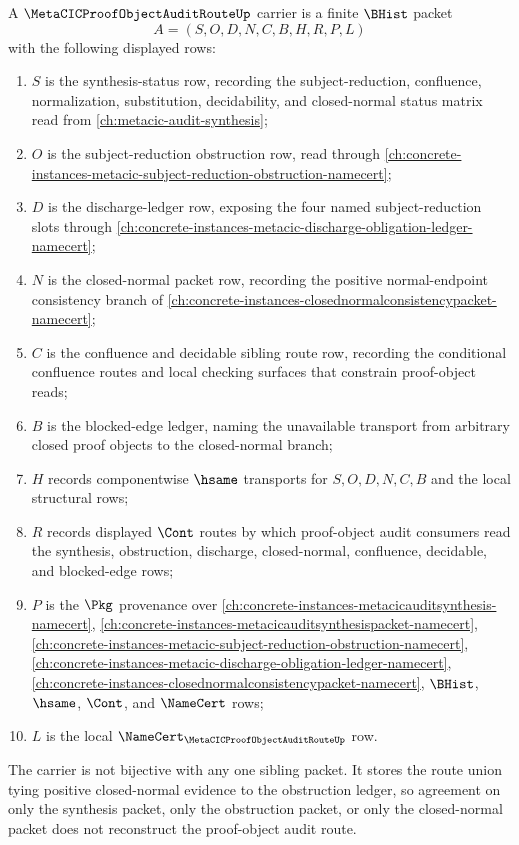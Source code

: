 \begin{definition}
\label{def:metacic-proof-object-audit-route-carrier}
A $\MetaCICProofObjectAuditRouteUp$ carrier is a finite $\BHist$ packet
$$
A=(S,O,D,N,C,B,H,R,P,L)
$$
with the following displayed rows:
\begin{enumerate}
\item $S$ is the synthesis-status row, recording the subject-reduction, confluence, normalization, substitution, decidability, and closed-normal status matrix read from \autoref{ch:metacic-audit-synthesis};
\item $O$ is the subject-reduction obstruction row, read through \autoref{ch:concrete-instances-metacic-subject-reduction-obstruction-namecert};
\item $D$ is the discharge-ledger row, exposing the four named subject-reduction slots through \autoref{ch:concrete-instances-metacic-discharge-obligation-ledger-namecert};
\item $N$ is the closed-normal packet row, recording the positive normal-endpoint consistency branch of \autoref{ch:concrete-instances-closednormalconsistencypacket-namecert};
\item $C$ is the confluence and decidable sibling route row, recording the conditional confluence routes and local checking surfaces that constrain proof-object reads;
\item $B$ is the blocked-edge ledger, naming the unavailable transport from arbitrary closed proof objects to the closed-normal branch;
\item $H$ records componentwise $\hsame$ transports for $S,O,D,N,C,B$ and the local structural rows;
\item $R$ records displayed $\Cont$ routes by which proof-object audit consumers read the synthesis, obstruction, discharge, closed-normal, confluence, decidable, and blocked-edge rows;
\item $P$ is the $\Pkg$ provenance over \autoref{ch:concrete-instances-metacicauditsynthesis-namecert}, \autoref{ch:concrete-instances-metacicauditsynthesispacket-namecert}, \autoref{ch:concrete-instances-metacic-subject-reduction-obstruction-namecert}, \autoref{ch:concrete-instances-metacic-discharge-obligation-ledger-namecert}, \autoref{ch:concrete-instances-closednormalconsistencypacket-namecert}, $\BHist$, $\hsame$, $\Cont$, and $\NameCert$ rows;
\item $L$ is the local $\NameCert_{\MetaCICProofObjectAuditRouteUp}$ row.
\end{enumerate}
The carrier is not bijective with any one sibling packet. It stores the route union tying positive closed-normal evidence to the obstruction ledger, so agreement on only the synthesis packet, only the obstruction packet, or only the closed-normal packet does not reconstruct the proof-object audit route.
\end{definition}

